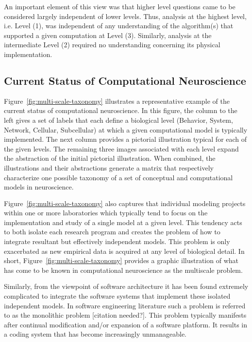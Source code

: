 \documentclass[11pt,3p,twocolumn]{JMN}
\begin{document}
An important element of this view was that higher level questions came to be considered largely independent of lower levels. Thus, analysis at the highest level, i.e. Level (1), was independent of any understanding of the algorithm(s) that supported a given computation at Level (3). Similarly, analysis at the intermediate Level (2) required no understanding concerning its physical implementation.

\subsection{Current Status of Computational Neuroscience}

Figure~\ref{fig:multi-scale-taxonomy} illustrates a representative example of the current status of computational neuroscience. In this figure, the column to the left gives a set of labels that each define a biological level (Behavior, System, Network, Cellular, Subcellular) at which a given computational model is typically implemented. The next column provides a pictorial illustration typical for each of the given levels. The remaining three images associated with each level expand the abstraction of the initial pictorial illustration. When combined, the illustrations and their abstractions generate a matrix that respectively characterize one possible taxonomy of a set of conceptual and computational models in neuroscience.

Figure~\ref{fig:multi-scale-taxonomy} also captures that individual modeling projects within one or more laboratories which typically tend to focus on the implementation and study of a single model at a given level. This tendency acts to both isolate each research program and creates the problem of how to integrate resultant but effectively independent models. This problem is only exacerbated as new empirical data is acquired at any level of biological detail. In short, Figure~\ref{fig:multi-scale-taxonomy} provides a graphic illustration of what has come to be known in computational neuroscience as the multiscale problem.

Similarly, from the viewpoint of software architecture it has been found extremely complicated to integrate the software systems that implement these isolated independent models.  In software engineering literature such a problem is referred to as the monolithic problem [citation needed?].
This problem typically manifests after continual modification and/or expansion of a software platform.  It results in a coding system that has become increasingly unmanageable.
\end{document}
